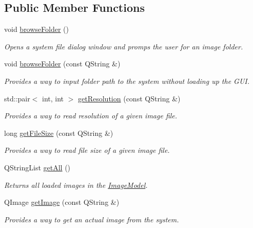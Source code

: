 \subsection*{Public Member Functions}
\begin{DoxyCompactItemize}
\item 
\mbox{\label{classImageModel_a556093e64b3d118525120e465a7dedf6}} 
void \hyperlink{classImageModel_a556093e64b3d118525120e465a7dedf6}{browse\+Folder} ()
\begin{DoxyCompactList}\small\item\em Opens a system file dialog window and promps the user for an image folder. \end{DoxyCompactList}\item 
void \hyperlink{classImageModel_a4923192da890831266d2348ce54b2e45}{browse\+Folder} (const Q\+String \&)
\begin{DoxyCompactList}\small\item\em Provides a way to input folder path to the system without loading up the G\+UI. \end{DoxyCompactList}\item 
std\+::pair$<$ int, int $>$ \hyperlink{classImageModel_af44b02e6974b36d2ede3b1b3f78ebc84}{get\+Resolution} (const Q\+String \&)
\begin{DoxyCompactList}\small\item\em Provides a way to read resolution of a given image file. \end{DoxyCompactList}\item 
long \hyperlink{classImageModel_a38c8d5868b7a8f8acca235c4383c5102}{get\+File\+Size} (const Q\+String \&)
\begin{DoxyCompactList}\small\item\em Provides a way to read file size of a given image file. \end{DoxyCompactList}\item 
Q\+String\+List \hyperlink{classImageModel_a498623ffa9423fd249c62467c01edeee}{get\+All} ()
\begin{DoxyCompactList}\small\item\em Returns all loaded images in the \hyperlink{classImageModel}{Image\+Model}. \end{DoxyCompactList}\item 
Q\+Image \hyperlink{classImageModel_ac0021794e5694bd76c76349b8af96428}{get\+Image} (const Q\+String \&)
\begin{DoxyCompactList}\small\item\em Provides a way to get an actual image from the system. \end{DoxyCompactList}\end{DoxyCompactItemize}
